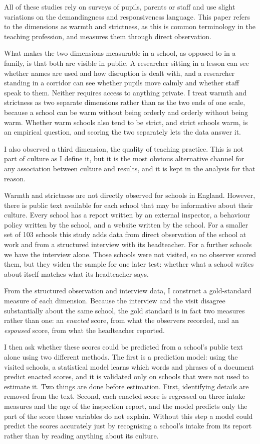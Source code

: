 All of these studies rely on surveys of pupils, parents or staff and
use slight variations on the demandingness and responsiveness language.
This paper refers to the dimensions as warmth and strictness, as this is common terminology in the
teaching profession, and measures them through direct observation.

What makes the two dimensions measurable in a school,
as opposed to in a family, is that both are visible in public. A researcher
sitting in a lesson can see whether names are used and how disruption is
dealt with, and a researcher standing in a corridor can see whether pupils
move calmly and whether staff speak to them. Neither requires access to
anything private. I treat warmth and strictness as two separate dimensions
rather than as the two ends of one scale, because a school can be warm
without being orderly and orderly without being warm. Whether warm schools
also tend to be strict, and strict schools warm, is an empirical question,
and scoring the two separately lets the data answer it.

I also observed a third dimension, the quality of teaching practice.
This is not part of culture as I define it, but it is the most obvious alternative channel
for any association between culture and results, and it is kept in the analysis for that reason.

Warmth and strictness are not directly observed for schools in England. However, there is public
text available for each school that may be informative about their culture.
Every school has a report written by an external inspector, a behaviour policy written by the
school, and a website written by the school. For a smaller set
of 103 schools this study adds data from direct observation of the school at work and from a
structured interview with its headteacher. For a further \NTierTwo{} schools we have the interview alone. Those schools were not visited, so no observer scored them, but they widen the sample for one later test: whether what a school writes about itself matches what its headteacher says.

From the structured observation and interview data, I construct a gold-standard measure of
each dimension. Because the interview and the visit disagree substantially about the same school,
the gold standard is in fact two measures rather than one: an \emph{enacted}
score, from what the observers recorded, and an \emph{espoused} score, from
what the headteacher reported.

I then ask whether these scores could be predicted from a school's public text alone using
two different methods.
The first is a prediction model: using the visited schools, a
statistical model learns which words and phrases of a document predict enacted scores, and it is validated only on schools that were not used to estimate it. Two things are done before estimation. First, identifying details are removed from the text. Second, each enacted score is regressed on three intake measures and the age of the inspection report, and the model predicts only the part of the score those variables do not explain. Without this step a model could predict the scores accurately just by recognising a school's intake from its report rather than by reading anything about its culture.

